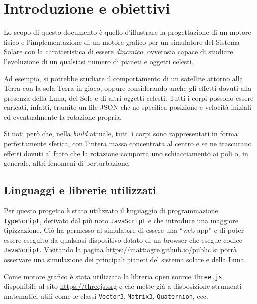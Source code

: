 \documentclass[11pt]{article}
\begin{document}
    

    \tableofcontents

    \section{Introduzione e obiettivi}

    Lo scopo di questo documento è quello d'illustrare la progettazione di un motore fisico e l'implementazione di un motore grafico per un simulatore del Sistema Solare con la caratteristica di essere \emph{dinamico}, ovverosia capace di studiare l'evoluzione di un qualsiasi numero di pianeti e oggetti celesti. 
	
	Ad esempio, si potrebbe studiare il comportamento di un satellite attorno alla Terra con la sola Terra in gioco, oppure considerando anche gli effetti dovuti alla presenza della Luna, del Sole e di altri oggetti celesti. Tutti i corpi possono essere caricati, infatti, tramite un file JSON che ne specifica posizione e velocità iniziali ed eventualmente la rotazione propria.

	Si noti però che, nella \emph{build} attuale, tutti i corpi sono rappresentati in forma perfettamente sferica, con l'intera massa concentrata al centro e se ne trascurano effetti dovuti al fatto che la rotazione comporta uno schiacciamento ai poli o, in generale, altri fenomeni di perturbazione.

	\subsection{Linguaggi e librerie utilizzati}

    Per questo progetto è stato utilizzato il linguaggio di programmazione \texttt{TypeScript}, derivato dal più noto \texttt{JavaScript} e che introduce una maggiore tipizzazione\cite{TypeScript}. Ciò ha permesso al simulatore di essere una ``\foreignlanguage{english}{web-app}'' e di poter essere eseguito da qualsiasi dispositivo dotato di un browser che esegue codice \texttt{JavaScript}. Visitando la pagina \url{https://mattiagre.github.io/public} si potrà osservare una simulazione dei principali pianeti del sistema solare e della Luna.

    Come motore grafico è stata utilizzata la libreria \foreignlanguage{english}{open source} \texttt{Three.js}, disponibile al sito \url{https://threejs.org} e che mette già a disposizione strumenti matematici utili come le classi \texttt{Vector3}, \texttt{Matrix3}, \texttt{Quaternion}, ecc\textellipsis. 
\end{document}
